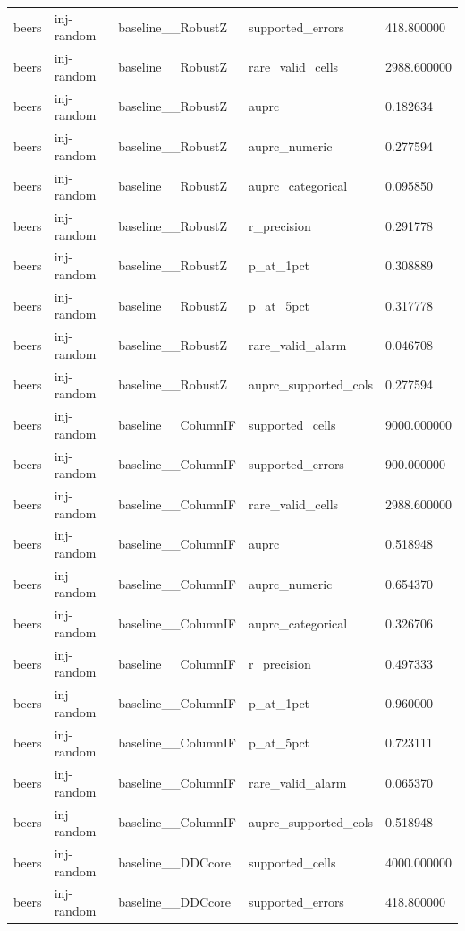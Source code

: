 \begin{tabular}{lllll}
beers & inj-random & baseline\_\_RobustZ & supported\_errors & 418.800000 \\
beers & inj-random & baseline\_\_RobustZ & rare\_valid\_cells & 2988.600000 \\
beers & inj-random & baseline\_\_RobustZ & auprc & 0.182634 \\
beers & inj-random & baseline\_\_RobustZ & auprc\_numeric & 0.277594 \\
beers & inj-random & baseline\_\_RobustZ & auprc\_categorical & 0.095850 \\
beers & inj-random & baseline\_\_RobustZ & r\_precision & 0.291778 \\
beers & inj-random & baseline\_\_RobustZ & p\_at\_1pct & 0.308889 \\
beers & inj-random & baseline\_\_RobustZ & p\_at\_5pct & 0.317778 \\
beers & inj-random & baseline\_\_RobustZ & rare\_valid\_alarm & 0.046708 \\
beers & inj-random & baseline\_\_RobustZ & auprc\_supported\_cols & 0.277594 \\
beers & inj-random & baseline\_\_ColumnIF & supported\_cells & 9000.000000 \\
beers & inj-random & baseline\_\_ColumnIF & supported\_errors & 900.000000 \\
beers & inj-random & baseline\_\_ColumnIF & rare\_valid\_cells & 2988.600000 \\
beers & inj-random & baseline\_\_ColumnIF & auprc & 0.518948 \\
beers & inj-random & baseline\_\_ColumnIF & auprc\_numeric & 0.654370 \\
beers & inj-random & baseline\_\_ColumnIF & auprc\_categorical & 0.326706 \\
beers & inj-random & baseline\_\_ColumnIF & r\_precision & 0.497333 \\
beers & inj-random & baseline\_\_ColumnIF & p\_at\_1pct & 0.960000 \\
beers & inj-random & baseline\_\_ColumnIF & p\_at\_5pct & 0.723111 \\
beers & inj-random & baseline\_\_ColumnIF & rare\_valid\_alarm & 0.065370 \\
beers & inj-random & baseline\_\_ColumnIF & auprc\_supported\_cols & 0.518948 \\
beers & inj-random & baseline\_\_DDCcore & supported\_cells & 4000.000000 \\
beers & inj-random & baseline\_\_DDCcore & supported\_errors & 418.800000 \\

\end{tabular}
